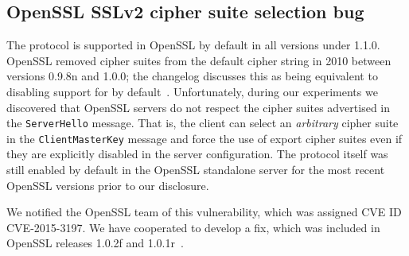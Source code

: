 \subsection{OpenSSL SSLv2 cipher suite selection bug}
\label{sec:openssl-selection}
The \ssltwo protocol is supported in OpenSSL by default in all versions under 1.1.0.
OpenSSL removed \ssltwo cipher suites from the default cipher string in 2010 between versions 0.9.8n and 1.0.0; the changelog discusses this as being equivalent to disabling support for \ssltwo by default~\cite{opensslchangelog}.   Unfortunately, during our experiments we discovered that OpenSSL servers do not respect the cipher suites advertised in the \texttt{ServerHello} message.
That is, the client can select an \textit{arbitrary} cipher suite in the \texttt{ClientMasterKey} message and force the use of export cipher suites even if they are explicitly disabled in the server configuration.
The \ssltwo protocol itself was still enabled by default in the OpenSSL standalone server for the most recent OpenSSL versions prior to our disclosure. %

We notified the OpenSSL team of this vulnerability, which was assigned CVE ID CVE-2015-3197. We have cooperated to develop a fix, which was included in OpenSSL releases 1.0.2f and 1.0.1r~\cite{opensslchangelog}. 

